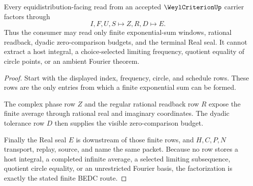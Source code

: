 \begin{theorem}
\label{thm:weyl-criterion-equidistribution-route}
Every equidistribution-facing read from an accepted $\WeylCriterionUp$ carrier factors through
$$
I,F,U,S \longmapsto Z,R,D \longmapsto E .
$$
Thus the consumer may read only finite exponential-sum windows, rational readback, dyadic zero-comparison budgets, and the terminal Real seal. It cannot extract a host integral, a choice-selected limiting frequency, quotient equality of circle points, or an ambient Fourier theorem.
\end{theorem}
\begin{proof}
Start with the displayed index, frequency, circle, and schedule rows. These rows are the only entries from which a finite exponential sum can be formed.

The complex phase row $Z$ and the regular rational readback row $R$ expose the finite average through rational real and imaginary coordinates. The dyadic tolerance row $D$ then supplies the visible zero-comparison budget.

Finally the Real seal $E$ is downstream of those finite rows, and $H,C,P,N$ transport, replay, source, and name the same packet. Because no row stores a host integral, a completed infinite average, a selected limiting subsequence, quotient circle equality, or an unrestricted Fourier basis, the factorization is exactly the stated finite BEDC route.
\end{proof}



